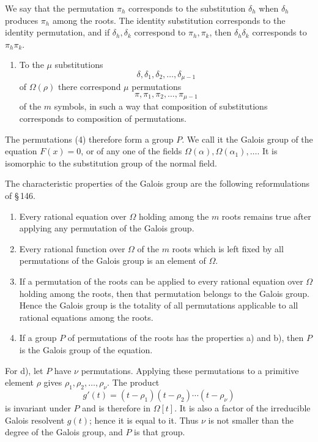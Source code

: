 \documentclass[11pt]{article}
\begin{document}
We say that the permutation $\pi_h$ corresponds to the substitution $\delta_h$ when $\delta_h$ produces $\pi_h$ among the roots. The identity substitution corresponds to the identity permutation, and if $\delta_h,\delta_k$ correspond to $\pi_h,\pi_k$, then $\delta_h\delta_k$ corresponds to $\pi_h\pi_k$.

\begin{enumerate}[label=\arabic*.,leftmargin=2em]
\item To the $\mu$ substitutions
\[
        \delta,\delta_1,
\delta_2,
\ldots,
\delta_{
\mu-1}
\tag{3}
\]
of $\Omega(\rho)$ there correspond $\mu$ permutations
\[
        \pi,\pi_1,
\pi_2,
\ldots,
\pi_{
\mu-1}
\tag{4}
\]
of the $m$ symbols, in such a way that composition of substitutions corresponds to composition of permutations.
\end{enumerate}

The permutations (4) therefore form a group $P$. We call it the Galois group of the equation $F(x)=0$, or of any one of the fields $\Omega(\alpha),\Omega(\alpha_1),\ldots$. It is isomorphic to the substitution group of the normal field.

The characteristic properties of the Galois group are the following reformulations of \S\,146.

\begin{enumerate}[label=\alph*)]
\item Every rational equation over $\Omega$ holding among the $m$ roots remains true after applying any permutation of the Galois group.
\item Every rational function over $\Omega$ of the $m$ roots which is left fixed by all permutations of the Galois group is an element of $\Omega$.
\item If a permutation of the roots can be applied to every rational equation over $\Omega$ holding among the roots, then that permutation belongs to the Galois group. Hence the Galois group is the totality of all permutations applicable to all rational equations among the roots.
\item If a group $P$ of permutations of the roots has the properties a) and b), then $P$ is the Galois group of the equation.
\end{enumerate}

For d), let $P$ have $\nu$ permutations. Applying these permutations to a primitive element $\rho$ gives $\rho_1,
\rho_2,
\ldots,
\rho_
\nu$. The product
\[
        g'(t)=(t-\rho_1)(t-\rho_2)\cdots(t-\rho_
\nu)
\]
is invariant under $P$ and is therefore in $\Omega[t]$. It is also a factor of the irreducible Galois resolvent $g(t)$; hence it is equal to it. Thus $\nu$ is not smaller than the degree of the Galois group, and $P$ is that group.
\end{document}
